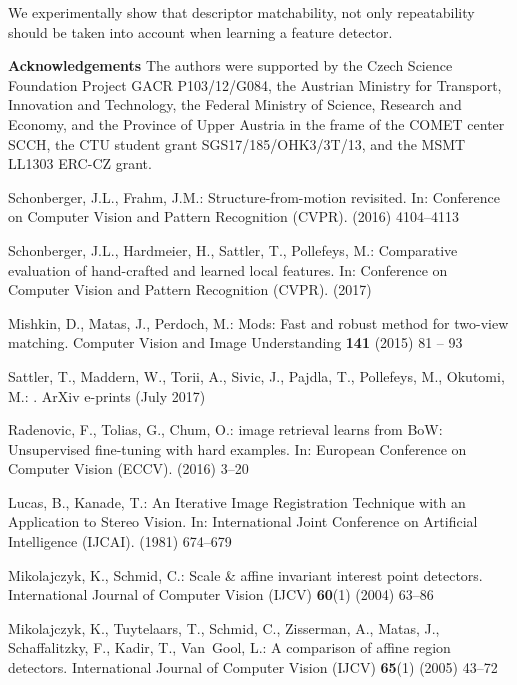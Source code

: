 \documentclass[runningheads]{llncs}
\begin{document}
We experimentally show that descriptor matchability, not only repeatability should be taken into account when learning a feature detector.


\textbf{Acknowledgements}
The authors were supported by the Czech Science Foundation Project GACR P103/12/G084, the Austrian Ministry for Transport, Innovation and Technology, the Federal Ministry of Science, Research and Economy, and the Province of Upper Austria in the frame of the COMET center SCCH, the CTU student grant SGS17/185/OHK3/3T/13, and the MSMT LL1303 ERC-CZ grant. 
\clearpage
{\small

\begin{thebibliography}{10}

Schonberger, J.L., Frahm, J.M.:
\newblock Structure-from-motion revisited.
\newblock In: Conference on Computer Vision and Pattern Recognition ({CVPR}).
  (2016)  4104--4113

Schonberger, J.L., Hardmeier, H., Sattler, T., Pollefeys, M.:
\newblock Comparative evaluation of hand-crafted and learned local features.
\newblock In: Conference on Computer Vision and Pattern Recognition (CVPR).
  (2017)

Mishkin, D., Matas, J., Perdoch, M.:
\newblock Mods: Fast and robust method for two-view matching.
\newblock Computer Vision and Image Understanding \textbf{141} (2015)  81 -- 93


{Sattler}, T., {Maddern}, W., {Torii}, A., {Sivic}, J., {Pajdla}, T.,
  {Pollefeys}, M., {Okutomi}, M.:
.
\newblock ArXiv e-prints (July 2017)

Radenovic, F., Tolias, G., Chum, O.:
 image retrieval learns from {BoW}: Unsupervised fine-tuning
  with hard examples.
\newblock In: European Conference on Computer Vision ({ECCV}). (2016)  3--20

Lucas, B., Kanade, T.:
\newblock An Iterative Image Registration Technique with an Application to Stereo Vision.
\newblock In: International Joint Conference on Artificial Intelligence ({IJCAI}). (1981)  674--679


Mikolajczyk, K., Schmid, C.:
\newblock Scale \& affine invariant interest point detectors.
\newblock International Journal of Computer Vision ({IJCV}) \textbf{60}(1)
  (2004)  63--86

Mikolajczyk, K., Tuytelaars, T., Schmid, C., Zisserman, A., Matas, J.,
  Schaffalitzky, F., Kadir, T., Van~Gool, L.:
\newblock A comparison of affine region detectors.
\newblock International Journal of Computer Vision ({IJCV}) \textbf{65}(1)
  (2005)  43--72


\end{thebibliography}}
\end{document}
